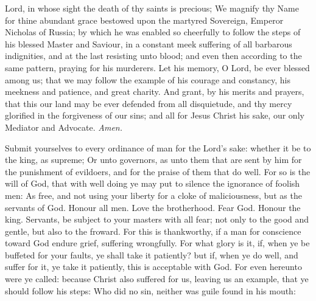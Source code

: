 \collect
%
 Lord, in whose sight the death of thy saints is precious; We magnify thy Name for thine abundant grace bestowed upon the martyred Sovereign, Emperor Nicholas of Russia; by which he was enabled so cheerfully to follow the steps of his blessed Master and Saviour, in a constant meek suffering of all barbarous indignities, and at the last resisting unto blood; and even then according to the same pattern, praying for his murderers. Let his memory, O Lord, be ever blessed among us; that we may follow the example of his courage and constancy, his meekness and patience, and great charity. And grant, by his merits and prayers, that this our land may be ever defended from all disquietude, and thy mercy glorified in the forgiveness of our sins; and all for Jesus Christ his sake, our only Mediator and Advocate. \textit{Amen.}

 Submit yourselves to every ordinance of man for the Lord's sake: whether it be to the king, as supreme; Or unto governors, as unto them that are sent by him for the punishment of evildoers, and for the praise of them that do well. For so is the will of God, that with well doing ye may put to silence the ignorance of foolish men: As free, and not using your liberty for a cloke of maliciousness, but as the servants of God. Honour all men. Love the brotherhood. Fear God. Honour the king. Servants, be subject to your masters with all fear; not only to the good and gentle, but also to the froward. For this is thankworthy, if a man for conscience toward God endure grief, suffering wrongfully. For what glory is it, if, when ye be buffeted for your faults, ye shall take it patiently? but if, when ye do well, and suffer for it, ye take it patiently, this is acceptable with God. For even hereunto were ye called: because Christ also suffered for us, leaving us an example, that ye should follow his steps: Who did no sin, neither was guile found in his mouth:

